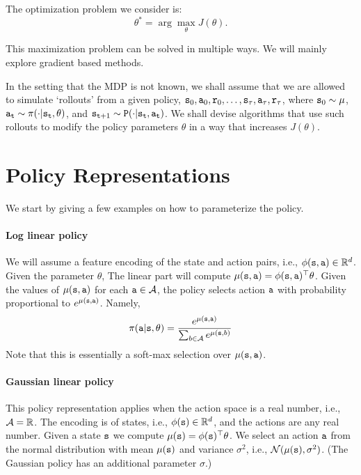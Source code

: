 The optimization problem we consider is:
\begin{equation}\label{eq:policy_opt}
\theta^* = \arg\max_\theta J(\theta).
\end{equation}

%
This maximization problem can be solved in multiple ways. We will
mainly explore gradient based methods.

In the setting that the MDP is not known, we shall assume that we are allowed to simulate `rollouts' from a given policy, ${\tt s}_0,{\tt a}_0,{\tt r}_0,\dots,{\tt s}_\tau, {\tt a}_\tau, {\tt r}_\tau$, where ${\tt s}_0 \sim \mu$, ${\tt a}_{\tt t}\sim \pi(\cdot|{\tt s}_{\tt t},\theta)$, and ${\tt s}_{{\tt t}+1} \sim {\tt P} (\cdot | {\tt s}_{\tt t}, {\tt a}_{\tt t})$. We shall devise algorithms that use such rollouts to modify the policy parameters $\theta$ in a way that increases $J(\theta)$.

\section{Policy Representations}
We start by giving a few examples on how to parameterize the policy.
\paragraph{Log linear policy} We will assume a feature encoding
of the state and action pairs, i.e., $\phi({\tt s},{\tt a})\in \mathbb{R}^{d}$. Given the parameter $\theta$, The linear part will compute $\mu({\tt s},{\tt a})=\phi({\tt s},{\tt a})^\top \theta$. Given the values of $\mu({\tt s},{\tt a})$ for each ${\tt a}\in \mathcal{A}$, the policy selects action ${\tt a}$ with probability proportional to
$e^{\mu({\tt s},{\tt a})}$. Namely,
\[
\pi({\tt a}|{\tt s},\theta)=
\frac{e^{\mu({\tt s},{\tt a})}}{\sum_{b\in
\mathcal{A}}e^{\mu({\tt s},b)}}
\]
Note that this is essentially a soft-max selection over $\mu({\tt s},{\tt a})$.

\paragraph{Gaussian linear policy} This policy representation applies when the action
space is a real number, i.e., $\mathcal{A}=\mathbb{R}$. The encoding is of states, i.e., $\phi({\tt s})\in \mathbb{R}^{d}$, and the actions are any real number. Given a state ${\tt s}$
we compute $\mu({\tt s})=\phi({\tt s})^\top\theta$. We select an
action ${\tt a}$ from the normal distribution with mean
$\mu({\tt s})$ and variance $\sigma^2$, i.e.,
$\mathcal{N}(\mu({\tt s}),\sigma^2)$. (The Gaussian policy has an additional
parameter $\sigma$.)

